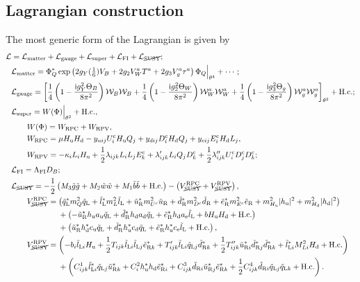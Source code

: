 \documentclass[CheatSheet]{subfiles}
\begin{document}
\subsection{Lagrangian construction}
The most generic form of the Lagrangian is given by
\begin{align}
\mathcal L &= \mathcal L\w{matter}+\mathcal L\w{gauge} + \mathcal L\w{super} + \mathcal L\w{FI} + \mathcal L_{\text{\cancel{SUSY}}};
\\%
&\mathcal L\w{matter}=
\Phi_Q^*
\exp\left(2g_Y(\tfrac16)V_B+2g_2V_W^aT^a+2g_3V_g^a\tau^a\right)\Phi_Q\Big|_{\theta^4} + \cdots;
\\&
\mathcal L\w{gauge}
=
\left[
 \frac14\left(1-\frac{\ii g_Y^2\Theta_B}{8\pi^2}\right)\mathcal W_B\mathcal W_B
+ \frac14\left(1-\frac{\ii g_2^2\Theta_W}{8\pi^2}\right)\mathcal W_W^a\mathcal W_W^a
+ \frac14\left(1-\frac{\ii g_3^2\Theta_g}{8\pi^2}\right)\mathcal W_g^a\mathcal W_g^a
\right]_{\theta^2} +\text{H.c.};
\\&
\mathcal L\w{super} = W(\Phi)\Big|_{\theta^2}+\text{H.c.},
\\&\qquad W(\Phi)=W\w{RPC}+W\w{RPV},
\\&\qquad
 W\w{RPC} = \mu\Hu\Hd
           - \yu[ij] U^\cc_i\Hu Q_j
           + \yd[ij] D^\cc_i\Hd Q_j
           + \ye[ij] E^\cc_i\Hd L_j,
\\&\qquad
 W\w{RPV} = -\kappa_i L_i\Hu
           + \frac12 \lambda  _{ijk} L_i L_j E^\cc_k
           +         \lambda' _{ijk} L_i Q_j D^\cc_k
           + \frac12 \lambda''_{ijk} U^\cc_i D^\cc_j D^\cc_k;
\\&
\mathcal L\w{FI}=\Lambda\w{FI} D_B;
\\&
\mathcal L_{\text{\cancel{SUSY}}}=
- \frac12\left(M_3\tig\tig+M_2\tiw\tiw+M_1\tib\tib+\text{H.c.}\right)
-
\left(
V^{\mathrm{RPC}}_{\text{\cancel{SUSY}}}
+V^{\mathrm{RPV}}_{\text{\cancel{SUSY}}}\right),
\\&\qquad
V^{\mathrm{RPC}}_{\text{\cancel{SUSY}}}=
\left(\tqL^*m_Q^2\tqL+\tlL^*m_L^2\tlL+\tuR^* m_{U^\cc}^2\tuR + \tdR^* m_{D^\cc}^2\tdR + \teR^* m_{E^\cc}^2\teR
       +m^2_{\Hu}|\hu|^2 + m^2_{\Hd}|\hd|^2\right)
\notag\\&\qquad\qquad\qquad
       +\left(-\tuR^*\hu {a\w u}\tqL + \tdR^* \hd {a\w d} \tqL+ \teR^* \hd {a\w e} \tlL + b\Hu\Hd+\text{H.c.}\right)
\notag\\&\qquad\qquad\qquad
       +\left(\tuR^*\hd^*{c\w u}\tqL+\tdR^* \hu^*{c\w d}\tqL+\teR^*\hu^*{c\w e}\tlL+\text{H.c.}\right),
\\&\qquad
V^{\mathrm{RPV}}_{\text{\cancel{SUSY}}}
=
    \left(-b_i\tlL[i]\Hu +\frac12T_{ijk}\tlL[i]\tlL[j]\teR[k]^*+T'_{ijk}\tlL[i]\tqL[j]\tdR[k]^*
             +\frac12T''_{ijk}\tuR[i]^*\tdR[j]^*\tdR[k]^*
    +\tlL[i]^*M^2_{Li}\Hd+\text{H.c.}\right)
\notag\\&\qquad\qquad\qquad
   + \left(C^1_{ijk}\tlL[i]^*\tqL[j]\tuR[k]^* + C^2_i\hu^*\hd\teR[i]^* + C^3_{ijk}\tdR[i]\tuR[j]^*\teR[k]^*+\frac12C^4_{ijk}\tdR[i]\tqL[j]\tqL[k]+\text{H.c.}\right).
\end{align}
\end{document}
